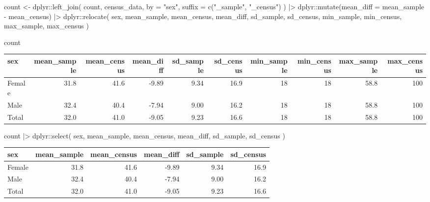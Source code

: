 \documentclass[
  12pt,
  a4paper,
  oneside]{tesesusp}
\newenvironment{Shaded}{\begin{snugshade}}{\end{snugshade}}
\newcommand{\AttributeTok}[1]{\textcolor[rgb]{0.40,0.45,0.13}{#1}}
\newcommand{\FunctionTok}[1]{\textcolor[rgb]{0.28,0.35,0.67}{#1}}
\newcommand{\NormalTok}[1]{\textcolor[rgb]{0.00,0.23,0.31}{#1}}
\newcommand{\OtherTok}[1]{\textcolor[rgb]{0.00,0.23,0.31}{#1}}
\newcommand{\SpecialCharTok}[1]{\textcolor[rgb]{0.37,0.37,0.37}{#1}}
\newcommand{\StringTok}[1]{\textcolor[rgb]{0.13,0.47,0.30}{#1}}
\begin{document}
\begin{Shaded}
\begin{Highlighting}[numbers=left,,]
\NormalTok{count }\OtherTok{\textless{}{-}} 
\NormalTok{  dplyr}\SpecialCharTok{::}\FunctionTok{left\_join}\NormalTok{(}
\NormalTok{    count, }
\NormalTok{    census\_data, }
    \AttributeTok{by =} \StringTok{"sex"}\NormalTok{, }
    \AttributeTok{suffix =} \FunctionTok{c}\NormalTok{(}\StringTok{"\_sample"}\NormalTok{, }\StringTok{"\_census"}\NormalTok{)}
\NormalTok{  ) }\SpecialCharTok{|\textgreater{}}
\NormalTok{  dplyr}\SpecialCharTok{::}\FunctionTok{mutate}\NormalTok{(}\AttributeTok{mean\_diff =}\NormalTok{ mean\_sample }\SpecialCharTok{{-}}\NormalTok{ mean\_census) }\SpecialCharTok{|\textgreater{}}
\NormalTok{  dplyr}\SpecialCharTok{::}\FunctionTok{relocate}\NormalTok{(}
\NormalTok{    sex, mean\_sample, mean\_census, mean\_diff, sd\_sample, sd\_census, }
\NormalTok{    min\_sample, min\_census, max\_sample, max\_census}
\NormalTok{  )}

\NormalTok{count}
\end{Highlighting}
\end{Shaded}

\begin{table}
\centering
\begin{tabular}{l|r|r|r|r|r|r|r|r|r}
\hline
sex & mean\_sample & mean\_census & mean\_diff & sd\_sample & sd\_census & min\_sample & min\_census & max\_sample & max\_census\\
\hline
Female & 31.8 & 41.6 & -9.89 & 9.34 & 16.9 & 18 & 18 & 58.8 & 100\\
\hline
Male & 32.4 & 40.4 & -7.94 & 9.00 & 16.2 & 18 & 18 & 58.8 & 100\\
\hline
Total & 32.0 & 41.0 & -9.05 & 9.23 & 16.6 & 18 & 18 & 58.8 & 100\\
\hline
\end{tabular}
\end{table}

\begin{Shaded}
\begin{Highlighting}[numbers=left,,]

\NormalTok{count }\SpecialCharTok{|\textgreater{}} 
\NormalTok{  dplyr}\SpecialCharTok{::}\FunctionTok{select}\NormalTok{(}
\NormalTok{    sex, mean\_sample, mean\_census, mean\_diff, sd\_sample, sd\_census}
\NormalTok{    )}
\end{Highlighting}
\end{Shaded}

\begin{table}
\centering
\begin{tabular}{l|r|r|r|r|r}
\hline
sex & mean\_sample & mean\_census & mean\_diff & sd\_sample & sd\_census\\
\hline
Female & 31.8 & 41.6 & -9.89 & 9.34 & 16.9\\
\hline
Male & 32.4 & 40.4 & -7.94 & 9.00 & 16.2\\
\hline
Total & 32.0 & 41.0 & -9.05 & 9.23 & 16.6\\
\hline
\end{tabular}
\end{table}
\end{document}
